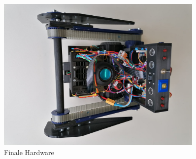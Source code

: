     \begin{figure}[H]
  \includegraphics[width=0.9\textwidth]{img/Sprint3/pren2_tests_treppe2.jpeg}
  \centering
  \caption{Finale Hardware}
  \label{fig:Tests auf Originaltreppe1}
  \end{figure}
 
 
  
  
  
  
  
  
  
  
  





  